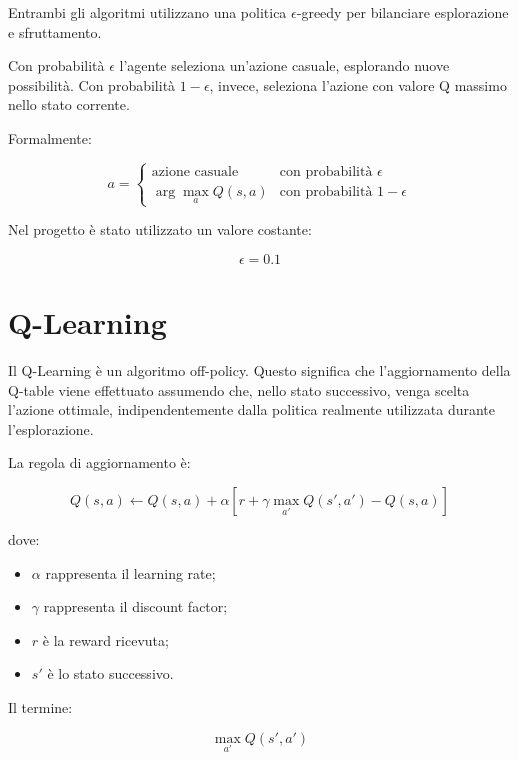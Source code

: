 \documentclass[12pt,a4paper]{report}
\begin{document}
Entrambi gli algoritmi utilizzano una politica $\epsilon$-greedy per bilanciare esplorazione e sfruttamento.

Con probabilità $\epsilon$ l’agente seleziona un’azione casuale, esplorando nuove possibilità. Con probabilità $1-\epsilon$, invece, seleziona l’azione con valore Q massimo nello stato corrente.

Formalmente:

\begin{equation}
a =
\begin{cases}
\text{azione casuale} & \text{con probabilità } \epsilon \\
\arg\max_a Q(s,a) & \text{con probabilità } 1-\epsilon
\end{cases}
\end{equation}

Nel progetto è stato utilizzato un valore costante:

\begin{equation}
\epsilon = 0.1
\end{equation}

\section{Q-Learning}

Il Q-Learning è un algoritmo off-policy. Questo significa che l’aggiornamento della Q-table viene effettuato assumendo che, nello stato successivo, venga scelta l’azione ottimale, indipendentemente dalla politica realmente utilizzata durante l’esplorazione.

La regola di aggiornamento è:

\begin{equation}
Q(s,a) \leftarrow Q(s,a) +
\alpha \left[
r + \gamma \max_{a'} Q(s',a') - Q(s,a)
\right]
\end{equation}

dove:

\begin{itemize}
    \item $\alpha$ rappresenta il learning rate;
    \item $\gamma$ rappresenta il discount factor;
    \item $r$ è la reward ricevuta;
    \item $s'$ è lo stato successivo.
\end{itemize}

Il termine:

\begin{equation}
\max_{a'} Q(s',a')
\end{equation}
\end{document}
